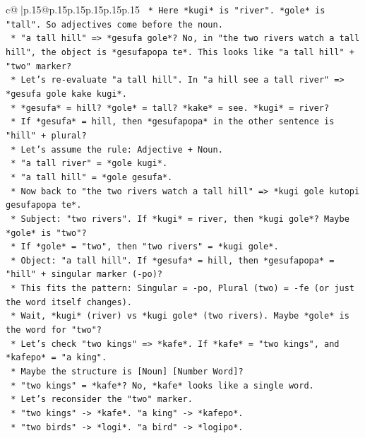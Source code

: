 \documentclass{article}
\begin{document}
{\begin{supertabular}{c@{$\;$}|p{.15\linewidth}@{}p{.15\linewidth}p{.15\linewidth}p{.15\linewidth}p{.15\linewidth}p{.15\linewidth}}
{{{\texttt{    *   Here *kugi* is "river". *gole* is "tall". So adjectives come before the noun.} \\
\texttt{    *   "a tall hill" => *gesufa gole*? No, in "the two rivers watch a tall hill", the object is *gesufapopa te*. This looks like "a tall hill" + "two" marker?} \\
\texttt{    *   Let's re{-}evaluate "a tall hill". In "a hill see a tall river" => *gesufa gole kake kugi*.} \\
\texttt{        *   *gesufa* = hill? *gole* = tall? *kake* = see. *kugi* = river?} \\
\texttt{        *   If *gesufa* = hill, then *gesufapopa* in the other sentence is "hill" + plural?} \\
\texttt{        *   Let's assume the rule: Adjective + Noun.} \\
\texttt{        *   "a tall river" = *gole kugi*.} \\
\texttt{        *   "a tall hill" = *gole gesufa*.} \\
\texttt{    *   Now back to "the two rivers watch a tall hill" => *kugi gole kutopi gesufapopa te*.} \\
\texttt{        *   Subject: "two rivers". If *kugi* = river, then *kugi gole*? Maybe *gole* is "two"?} \\
\texttt{        *   If *gole* = "two", then "two rivers" = *kugi gole*.} \\
\texttt{        *   Object: "a tall hill". If *gesufa* = hill, then *gesufapopa* = "hill" + singular marker ({-}po)?} \\
\texttt{        *   This fits the pattern: Singular = {-}po, Plural (two) = {-}fe (or just the word itself changes).} \\
\texttt{        *   Wait, *kugi* (river) vs *kugi gole* (two rivers). Maybe *gole* is the word for "two"?} \\
\texttt{        *   Let's check "two kings" => *kafe*. If *kafe* = "two kings", and *kafepo* = "a king".} \\
\texttt{        *   Maybe the structure is {[}Noun{]} {[}Number Word{]}?} \\
\texttt{        *   "two kings" = *kafe*? No, *kafe* looks like a single word.} \\
\texttt{        *   Let's reconsider the "two" marker.} \\
\texttt{        *   "two kings" {-}> *kafe*. "a king" {-}> *kafepo*.} \\
\texttt{        *   "two birds" {-}> *logi*. "a bird" {-}> *logipo*.} \\
}}}
\end{supertabular}}
\end{document}
